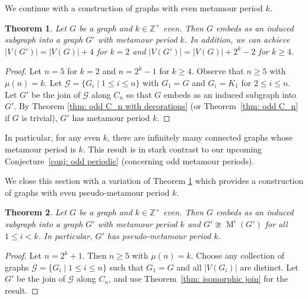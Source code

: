 \documentclass[12pt]{amsart}
\newtheorem{theorem}{Theorem}[section]
\theoremstyle{definition}
\theoremstyle{remark}
\numberwithin{equation}{section}
\numberwithin{figure}{section}
\newcommand{\M}{\operatorname{M}}
\newcommand{\Z}{\mathbb{Z}}
\begin{document}
We continue with a construction of graphs with even metamour period $k$.

\begin{theorem}
\label{thm:induced subgraph}
    Let $G$ be a graph and $k\in\Z^+$ even. Then $G$ embeds as an induced subgraph into a graph $G'$ with metamour period $k$. In addition, we can achieve $|V(G')|=|V(G)|+4$ for $k=2$ and $|V(G')|=|V(G)|+2^k-2$ for $k\ge 4$.
\end{theorem}

\begin{proof}
    Let $n=5$ for $k=2$ and $n=2^k-1$ for $k\ge 4$. Observe that $n\ge 5$ with $\mu(n)=k$.
    Let $\mathcal{G}=\{G_i \mid 1\leq i \leq n\}$ with $G_1=G$ and $G_i=K_1$ for $2\leq i \leq n$.
    Let $G'$ be the join of $\mathcal{G}$ along $C_n$ so that $G$ embeds as an induced subgraph into $G'$. By Theorem \ref{thm: odd C_n with decorations} (or Theorem~\ref{thm: odd C_n} if $G$ is trivial), $G'$ has metamour period $k$.
\end{proof}

In particular, for any even $k$, there are infinitely many connected graphs whose metamour period is $k$. This result is in stark contrast to our upcoming Conjecture~\ref{conj: odd periodic} (concerning odd metamour periods).

We close this section with a variation of Theorem \ref{thm:induced subgraph} which provides a construction of graphs with even pseudo-metamour period $k$.

\begin{theorem}
\label{thm:induced subgraph2}
    Let $G$ be a graph and $k\in\Z^+$ even. Then $G$ embeds as an induced subgraph into a graph $G'$ with metamour period $k$ and $G'\ncong \M^i(G')$ for all $1\le i< k$. In particular, $G'$ has pseudo-metamour period $k$.
\end{theorem}

\begin{proof}
    Let $n=2^k+1$. Then $n\ge 5$ with $\mu(n)=k$.
    Choose any collection of graphs $\mathcal{G}=\{G_i \mid 1\leq i \leq n\}$ such that $G_1=G$ and all $|V(G_i)|$ are distinct.
    Let $G'$ be the join of $\mathcal{G}$ along $C_n$, and use Theorem~\ref{thm: isomorphic join} for the result.
\end{proof}
\end{document}
